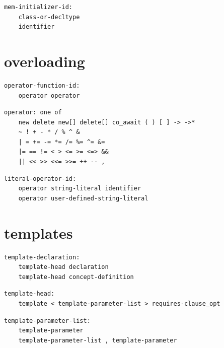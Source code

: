 \noindent\textbf{\texttt{}}\par
\begin{lstlisting}
mem-initializer-id:
    class-or-decltype
    identifier
\end{lstlisting}

\section{overloading}

\noindent\textbf{\texttt{}}\par
\begin{lstlisting}
operator-function-id:
    operator operator
\end{lstlisting}

\noindent\textbf{\texttt{}}\par
\begin{lstlisting}
operator: one of
    new delete new[] delete[] co_await ( ) [ ] -> ->*
    ~ ! + - * / % ^ &
    | = += -= *= /= %= ^= &=
    |= == != < > <= >= <=> &&
    || << >> <<= >>= ++ -- ,
\end{lstlisting}

\noindent\textbf{\texttt{}}\par
\begin{lstlisting}
literal-operator-id:
    operator string-literal identifier
    operator user-defined-string-literal
\end{lstlisting}

\section{templates}

\noindent\textbf{\texttt{}}\par
\begin{lstlisting}
template-declaration:
    template-head declaration
    template-head concept-definition
\end{lstlisting}

\noindent\textbf{\texttt{}}\par
\begin{lstlisting}
template-head:
    template < template-parameter-list > requires-clause_opt
\end{lstlisting}

\noindent\textbf{\texttt{}}\par
\begin{lstlisting}
template-parameter-list:
    template-parameter
    template-parameter-list , template-parameter
\end{lstlisting}

